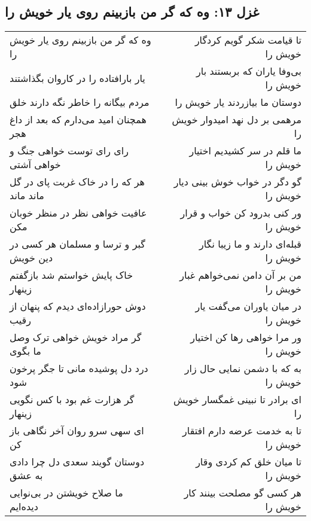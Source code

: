 \begin{center}
\section*{غزل ۱۳: وه که گر من بازبینم روی یار خویش را}
\label{sec:013}
\begin{longtable}{l p{0.5cm} r}
وه که گر من بازبینم روی یار خویش را
&&
تا قیامت شکر گویم کردگار خویش را
\\
یار بارافتاده را در کاروان بگذاشتند
&&
بی‌وفا یاران که بربستند بار خویش را
\\
مردم بیگانه را خاطر نگه دارند خلق
&&
دوستان ما بیازردند یار خویش را
\\
همچنان امید می‌دارم که بعد از داغ هجر
&&
مرهمی بر دل نهد امیدوار خویش را
\\
رای رای توست خواهی جنگ و خواهی آشتی
&&
ما قلم در سر کشیدیم اختیار خویش را
\\
هر که را در خاک غربت پای در گل ماند ماند
&&
گو دگر در خواب خوش بینی دیار خویش را
\\
عافیت خواهی نظر در منظر خوبان مکن
&&
ور کنی بدرود کن خواب و قرار خویش را
\\
گبر و ترسا و مسلمان هر کسی در دین خویش
&&
قبله‌ای دارند و ما زیبا نگار خویش را
\\
خاک پایش خواستم شد بازگفتم زینهار
&&
من بر آن دامن نمی‌خواهم غبار خویش را
\\
دوش حورازاده‌ای دیدم که پنهان از رقیب
&&
در میان یاوران می‌گفت یار خویش را
\\
گر مراد خویش خواهی ترک وصل ما بگوی
&&
ور مرا خواهی رها کن اختیار خویش را
\\
درد دل پوشیده مانی تا جگر پرخون شود
&&
به که با دشمن نمایی حال زار خویش را
\\
گر هزارت غم بود با کس نگویی زینهار
&&
ای برادر تا نبینی غمگسار خویش را
\\
ای سهی سرو روان آخر نگاهی باز کن
&&
تا به خدمت عرضه دارم افتقار خویش را
\\
دوستان گویند سعدی دل چرا دادی به عشق
&&
تا میان خلق کم کردی وقار خویش را
\\
ما صلاح خویشتن در بی‌نوایی دیده‌ایم
&&
هر کسی گو مصلحت بینند کار خویش را
\\
\end{longtable}
\end{center}
